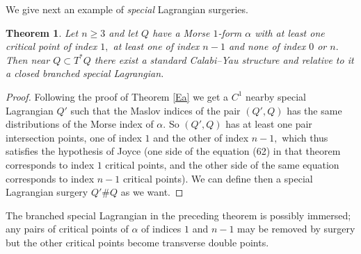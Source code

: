 \documentclass{article}
\theoremstyle{plain}%
\newtheorem{thm}{Theorem}[section]
\theoremstyle{definition}
\numberwithin{equation}{section}
\numberwithin{figure}{section}
\def\l{\label}
\def\ge{\geqslant}
\def\al{\alpha}
\begin{document}
We give next an example of {\it special} Lagrangian surgeries.
\begin{thm}\l{E}
Let $n\ge3$ and let $Q$ have a  Morse $1$-form $\al$ with at least one critical point of index $1,$
at least one of index $n-1$ and none of index $0$ or $n.$
Then near $Q\subset T^*Q$ there exist a standard Calabi--Yau structure and relative to it a closed branched special Lagrangian.
\end{thm}
\begin{proof}
Following the proof of Theorem \ref{Ea} we get a $C^1$ nearby special Lagrangian $Q'$ such that the Maslov indices of the pair $(Q',Q)$ has the same distributions of the Morse index of $\al.$
So $(Q',Q)$ has at least one pair intersection points, one of index $1$ and the other of index $n-1,$ which thus satisfies the hypothesis of Joyce \cite[Theorem 9.7]{J5} (one side of the equation (62) in that theorem corresponds to index $1$ critical points, and the other side of the same equation corresponds to index $n-1$ critical points).
We can define then a special Lagrangian surgery $Q'\#Q$ as we want.
\end{proof}

The branched special Lagrangian in the preceding theorem is possibly immersed; any pairs of critical points of $\al$ of indices $1$ and $n-1$ may be removed by surgery but the other critical points become transverse double points.
\end{document}
